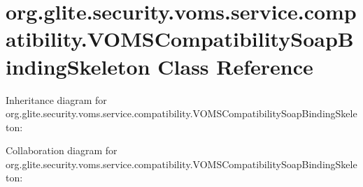 \hypertarget{classorg_1_1glite_1_1security_1_1voms_1_1service_1_1compatibility_1_1VOMSCompatibilitySoapBindingSkeleton}{
\section{org.glite.security.voms.service.compatibility.VOMSCompatibilitySoapBindingSkeleton Class Reference}
\label{classorg_1_1glite_1_1security_1_1voms_1_1service_1_1compatibility_1_1VOMSCompatibilitySoapBindingSkeleton}
}


Inheritance diagram for org.glite.security.voms.service.compatibility.VOMSCompatibilitySoapBindingSkeleton:


Collaboration diagram for org.glite.security.voms.service.compatibility.VOMSCompatibilitySoapBindingSkeleton:
